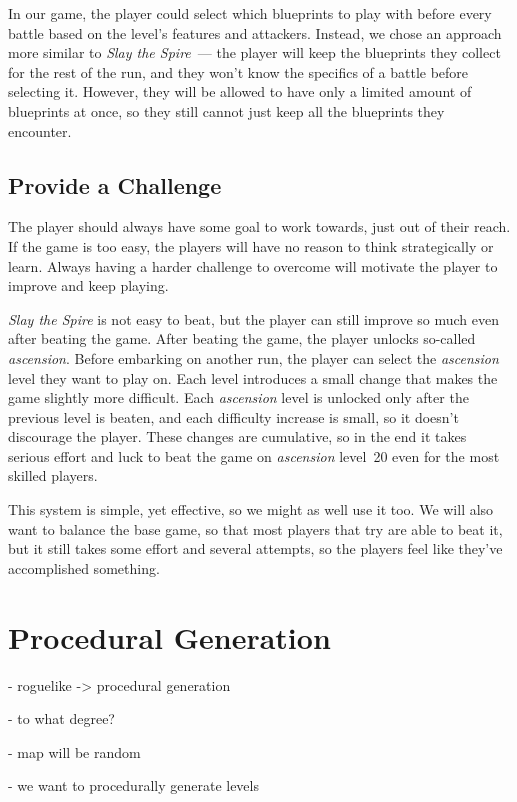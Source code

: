 In our game, the player could select which blueprints to play with before every battle based on the level's features and attackers.
Instead, we chose an approach more similar to \emph{Slay the Spire}~--- the player will keep the blueprints they collect for the rest of the run, and they won't know the specifics of a battle before selecting it.
However, they will be allowed to have only a limited amount of blueprints at once, so they still cannot just keep all the blueprints they encounter.

\subsection{Provide a Challenge} \label{sec:goal-challenge}

The player should always have some goal to work towards, just out of their reach.
If the game is too easy, the players will have no reason to think strategically or learn.
Always having a harder challenge to overcome will motivate the player to improve and keep playing.

\emph{Slay the Spire} is not easy to beat, but the player can still improve so much even after beating the game.
After beating the game, the player unlocks so-called \emph{ascension}.
Before embarking on another run, the player can select the \emph{ascension} level they want to play on.
Each level introduces a small change that makes the game slightly more difficult.
Each \emph{ascension} level is unlocked only after the previous level is beaten, and each difficulty increase is small, so it doesn't discourage the player.
These changes are cumulative, so in the end it takes serious effort and luck to beat the game on \emph{ascension} level~20 even for the most skilled players.

This system is simple, yet effective, so we might as well use it too.
We will also want to balance the base game, so that most players that try are able to beat it, but it still takes some effort and several attempts, so the players feel like they've accomplished something.

\section{Procedural Generation}

- roguelike -> procedural generation

- to what degree?

- map will be random

- we want to procedurally generate levels

